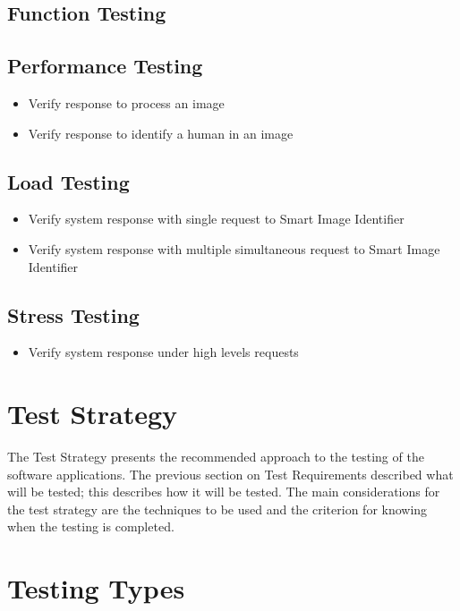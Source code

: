 \documentclass[a4paper,12pt]{report}
\begin{document}
	\subsection {Function Testing}
	\subsection {Performance Testing}
		\begin {itemize}
			\item Verify response to process an image
			\item Verify response to identify a human in an image
		\end {itemize}
	\subsection {Load Testing}
		\begin {itemize}
			\item Verify system response with single request to Smart Image Identifier
			\item Verify system response with multiple simultaneous request to Smart Image Identifier
		\end {itemize}
	\subsection {Stress Testing}
		\begin {itemize}
			\item Verify system response under high levels requests
		\end {itemize}
	
\section {Test Strategy}
	The Test Strategy presents the recommended approach to the testing of the software applications. The previous section on Test Requirements described what will be tested; this describes how it will be tested.
	The main considerations for the test strategy are the techniques to be used and the criterion for knowing when the testing is completed.
	
	\section {Testing Types}
\end{document}
